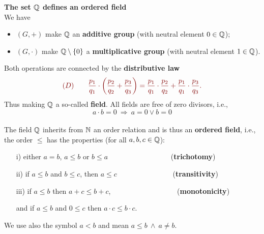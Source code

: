 {\begin{itemize}
\textbf{\large The set ${\mathbb{Q}}$ defines an ordered field}\\
We have
\begin{itemize}
\item $(G,+)$ make ${\mathbb{Q}}$ an \textbf{additive group} (with neutral element $0\in{\mathbb{Q}}$);
\item $(G,\cdot)$ make ${\mathbb{Q}}\setminus\{0\}$ a \textbf{multiplicative group} (with neutral element $1\in {\mathbb{Q}}$).
\end{itemize}
Both operations are connected by the \textbf{distributive law}
\[\color{satzrot}
(D)\qquad \frac{p_1}{q_1}\cdot \left(\frac{p_2}{q_2}+\frac{p_3}{q_3}\right)=
\frac{p_1}{q_1}\cdot \frac{p_2}{q_2}+\frac{p_1}{q_1}\cdot \frac{p_3}{q_3}.
\]
Thus making ${\mathbb{Q}}$ a so-called \textbf{\textbf{field}}. All fields are free of zero divisors, i.e.,
\color{satzrot}
\[
a\cdot b=0\ \Rightarrow\  a=0\vee b=0
\]
%
~\\
\color{black}
The field ${\mathbb{Q}}$ inherits from ${\mathbb{N}}$ an order relation and is thus an \textbf{\textbf{ordered field}}, i.e., the order  $\le$ has the properties (for all $a,b,c\in{\mathbb{Q}}$):
\begin{itemize}\color{defgruen}
\item[i)] either $a=b$, $a \le b$ or $b\le a$ ~~~~~~~~~~~~~~~~~(\textbf{trichotomy})
\item[ii)] if $a\le b$ and $b\le c$, then $a\le c$ ~~~~~~~~~~~~~~~(\textbf{transitivity})
\item[iii)]  if $a\le b$ then $a+c\le b+c$, ~~~~~~~~~~~~~~~~~~(\textbf{monotonicity})
\item[] and if $a\le b$ and $0\le c$ then $a\cdot c\le b\cdot c$.
\end{itemize}
We use also the symbol $a<b$ and mean $a\le b~\wedge ~a\neq b$.


\end{itemize}}
